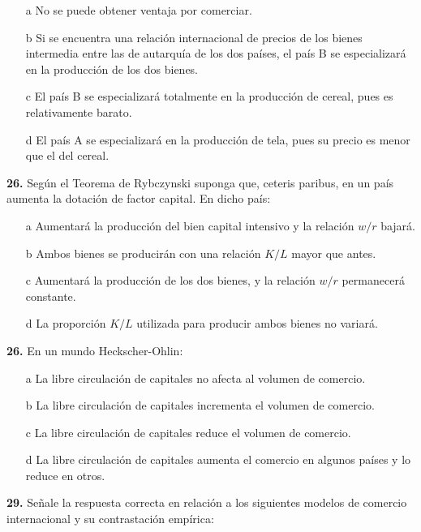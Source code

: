 \documentclass{nuevotema}
\begin{document}
\begin{itemize}
	\item[a] No se puede obtener ventaja por comerciar.
	\item[b] Si se encuentra una relación internacional de precios de los bienes intermedia entre las de autarquía de los dos países, el país B se especializará en la producción de los dos bienes.
	\item[c] El país B se especializará totalmente en la producción de cereal, pues es relativamente barato.
	\item[d] El país A se especializará en la producción de tela, pues su precio es menor que el del cereal. 
\end{itemize}

\bigskip
\textbf{26.} Según el Teorema de Rybczynski suponga que, ceteris paribus, en un país aumenta la dotación de factor capital. En dicho país:

\begin{itemize}
	\item[a] Aumentará la producción del bien capital intensivo y la relación $w/r$ bajará.
	\item[b] Ambos bienes se producirán con una relación $K/L$ mayor que antes.
	\item[c] Aumentará la producción de los dos bienes, y la relación $w/r$ permanecerá constante.
	\item[d] La proporción $K/L$ utilizada para producir ambos bienes no variará. 
\end{itemize}

\textbf{26.} En un mundo Heckscher-Ohlin:

\begin{itemize}
	\item[a] La libre circulación de capitales no afecta al volumen de comercio.
	\item[b] La libre circulación de capitales incrementa el volumen de comercio.
	\item[c] La libre circulación de capitales reduce el volumen de comercio.
	\item[d] La libre circulación de capitales aumenta el comercio en algunos países y lo reduce en otros.
\end{itemize}


\textbf{29.} Señale la respuesta correcta en relación a los siguientes modelos de comercio internacional y su contrastación empírica:
\end{document}
